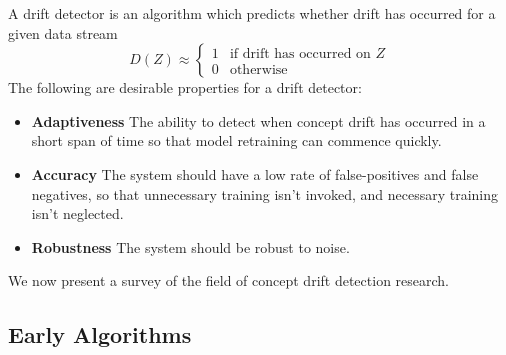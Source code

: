 A drift detector is an algorithm which predicts whether drift has occurred for a given data stream
\begin{equation}
    D(Z) \approx \begin{cases}
    1 & \text{if drift has occurred on $Z$} \\
    0 & \text{otherwise}
    \end{cases}
\end{equation}
The following are desirable properties for a drift detector:
\begin{itemize}
    \item {\bf Adaptiveness} The ability to detect when concept drift has occurred in a short span of time so that model retraining can commence quickly.
    \item {\bf Accuracy} The system should have a low rate of false-positives and false negatives, so that unnecessary training isn't invoked, and necessary training isn't neglected.
    \item {\bf Robustness} The system should be robust to noise.
\end{itemize}

We now present a survey of the field of concept drift detection research.


\subsection{Early Algorithms}

